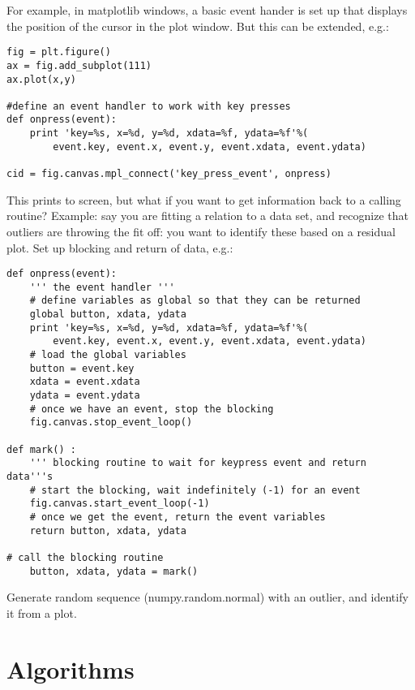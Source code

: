 \documentclass{article}
\begin{document}
For example, in matplotlib windows, a basic event hander is set up
that displays the position of the cursor in the plot window. But this
can be extended, e.g.:
\begin{verbatim}
fig = plt.figure()
ax = fig.add_subplot(111)
ax.plot(x,y)

#define an event handler to work with key presses
def onpress(event):
    print 'key=%s, x=%d, y=%d, xdata=%f, ydata=%f'%(
        event.key, event.x, event.y, event.xdata, event.ydata)

cid = fig.canvas.mpl_connect('key_press_event', onpress)
\end{verbatim}
This prints to screen, but what if you want to get information back to
a calling routine? Example: say you are fitting a relation to a data
set, and recognize that outliers are throwing the fit off: you want to
identify these based on a residual plot. Set up blocking and return of
data, e.g.:
\begin{verbatim}
def onpress(event):
    ''' the event handler '''
    # define variables as global so that they can be returned
    global button, xdata, ydata
    print 'key=%s, x=%d, y=%d, xdata=%f, ydata=%f'%(
        event.key, event.x, event.y, event.xdata, event.ydata)
    # load the global variables
    button = event.key
    xdata = event.xdata
    ydata = event.ydata
    # once we have an event, stop the blocking
    fig.canvas.stop_event_loop()

def mark() :
    ''' blocking routine to wait for keypress event and return data'''s
    # start the blocking, wait indefinitely (-1) for an event
    fig.canvas.start_event_loop(-1)
    # once we get the event, return the event variables
    return button, xdata, ydata

# call the blocking routine
    button, xdata, ydata = mark()
\end{verbatim}

Generate random sequence (numpy.random.normal) with an outlier, and
identify it from a plot.

\newpage
\section{Algorithms}
\end{document}
